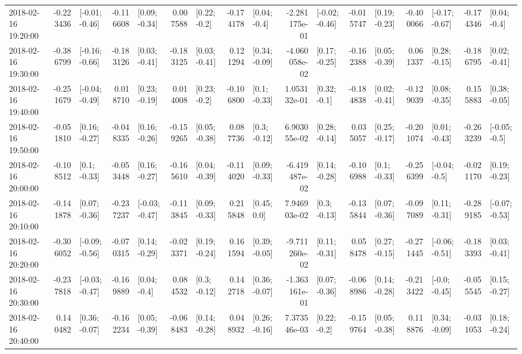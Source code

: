 \begin{tabular}{lrlrlrlrlrlrlrlrl}
2018-02-16 19:20:00 & -0.223436 &  [-0.01; -0.46] & -0.116608 &   [0.09; -0.34] &  0.007588 &    [0.22; -0.2] & -0.174178 &    [0.04; -0.4] & -2.281175e-01 &  [-0.02; -0.46] & -0.015747 &   [0.19; -0.23] & -0.400066 &  [-0.17; -0.67] & -0.174346 &    [0.04; -0.4] \\
2018-02-16 19:30:00 & -0.386799 &  [-0.16; -0.66] & -0.183126 &   [0.03; -0.41] & -0.183125 &   [0.03; -0.41] &  0.121294 &   [0.34; -0.09] & -4.060058e-02 &   [0.17; -0.25] & -0.162388 &   [0.05; -0.39] &  0.061337 &   [0.28; -0.15] & -0.186795 &   [0.02; -0.41] \\
2018-02-16 19:40:00 & -0.251679 &  [-0.04; -0.49] &  0.018710 &   [0.23; -0.19] &  0.014008 &    [0.23; -0.2] & -0.106800 &    [0.1; -0.33] &  1.053132e-01 &    [0.32; -0.1] & -0.184838 &   [0.02; -0.41] & -0.129039 &   [0.08; -0.35] &  0.155883 &   [0.38; -0.05] \\
2018-02-16 19:50:00 & -0.051810 &   [0.16; -0.27] & -0.048335 &   [0.16; -0.26] & -0.159265 &   [0.05; -0.38] &  0.087736 &    [0.3; -0.12] &  6.903055e-02 &   [0.28; -0.14] &  0.035057 &   [0.25; -0.17] & -0.201074 &   [0.01; -0.43] & -0.263239 &   [-0.05; -0.5] \\
2018-02-16 20:00:00 & -0.108512 &    [0.1; -0.33] & -0.053448 &   [0.16; -0.27] & -0.165610 &   [0.04; -0.39] & -0.114020 &   [0.09; -0.33] & -6.419487e-02 &   [0.14; -0.28] & -0.106988 &    [0.1; -0.33] & -0.256399 &   [-0.04; -0.5] & -0.021170 &   [0.19; -0.23] \\
2018-02-16 20:10:00 & -0.141878 &   [0.07; -0.36] & -0.237237 &  [-0.03; -0.47] & -0.113845 &   [0.09; -0.33] &  0.215848 &     [0.45; 0.0] &  7.946903e-02 &    [0.3; -0.13] & -0.135844 &   [0.07; -0.36] & -0.097089 &   [0.11; -0.31] & -0.289185 &  [-0.07; -0.53] \\
2018-02-16 20:20:00 & -0.306052 &  [-0.09; -0.56] & -0.070315 &   [0.14; -0.29] & -0.023371 &   [0.19; -0.24] &  0.161594 &   [0.39; -0.05] & -9.711260e-02 &   [0.11; -0.31] &  0.058478 &   [0.27; -0.15] & -0.271445 &  [-0.06; -0.51] & -0.183393 &   [0.03; -0.41] \\
2018-02-16 20:30:00 & -0.237818 &  [-0.03; -0.47] & -0.169889 &    [0.04; -0.4] &  0.084532 &    [0.3; -0.12] &  0.142718 &   [0.36; -0.07] & -1.363161e-01 &   [0.07; -0.36] & -0.068986 &   [0.14; -0.28] & -0.213422 &   [-0.0; -0.45] & -0.055545 &   [0.15; -0.27] \\
2018-02-16 20:40:00 &  0.140482 &   [0.36; -0.07] & -0.162234 &   [0.05; -0.39] & -0.068483 &   [0.14; -0.28] &  0.048932 &   [0.26; -0.16] &  7.373546e-03 &    [0.22; -0.2] & -0.159764 &   [0.05; -0.38] &  0.118876 &   [0.34; -0.09] & -0.031053 &   [0.18; -0.24] \\

\end{tabular}
